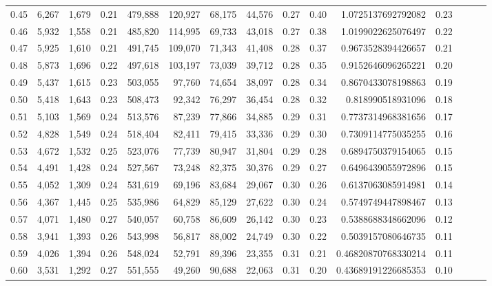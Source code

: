 \begin{tabular}{rrrrrrrrrrrrrrr}
0.45 &   6,267 &  1,679 &  0.21 &  479,888 &  120,927 &   68,175 &   44,576 &  0.27 &  0.40 &    1.0725137692792082 &      0.23 \\
0.46 &   5,932 &  1,558 &  0.21 &  485,820 &  114,995 &   69,733 &   43,018 &  0.27 &  0.38 &    1.0199022625076497 &      0.22 \\
0.47 &   5,925 &  1,610 &  0.21 &  491,745 &  109,070 &   71,343 &   41,408 &  0.28 &  0.37 &    0.9673528394426657 &      0.21 \\
0.48 &   5,873 &  1,696 &  0.22 &  497,618 &  103,197 &   73,039 &   39,712 &  0.28 &  0.35 &    0.9152646096265221 &      0.20 \\
0.49 &   5,437 &  1,615 &  0.23 &  503,055 &   97,760 &   74,654 &   38,097 &  0.28 &  0.34 &    0.8670433078198863 &      0.19 \\
0.50 &   5,418 &  1,643 &  0.23 &  508,473 &   92,342 &   76,297 &   36,454 &  0.28 &  0.32 &     0.818990518931096 &      0.18 \\
0.51 &   5,103 &  1,569 &  0.24 &  513,576 &   87,239 &   77,866 &   34,885 &  0.29 &  0.31 &    0.7737314968381656 &      0.17 \\
0.52 &   4,828 &  1,549 &  0.24 &  518,404 &   82,411 &   79,415 &   33,336 &  0.29 &  0.30 &    0.7309114775035255 &      0.16 \\
0.53 &   4,672 &  1,532 &  0.25 &  523,076 &   77,739 &   80,947 &   31,804 &  0.29 &  0.28 &    0.6894750379154065 &      0.15 \\
0.54 &   4,491 &  1,428 &  0.24 &  527,567 &   73,248 &   82,375 &   30,376 &  0.29 &  0.27 &    0.6496439055972896 &      0.15 \\
0.55 &   4,052 &  1,309 &  0.24 &  531,619 &   69,196 &   83,684 &   29,067 &  0.30 &  0.26 &    0.6137063085914981 &      0.14 \\
0.56 &   4,367 &  1,445 &  0.25 &  535,986 &   64,829 &   85,129 &   27,622 &  0.30 &  0.24 &    0.5749749447898467 &      0.13 \\
0.57 &   4,071 &  1,480 &  0.27 &  540,057 &   60,758 &   86,609 &   26,142 &  0.30 &  0.23 &    0.5388688348662096 &      0.12 \\
0.58 &   3,941 &  1,393 &  0.26 &  543,998 &   56,817 &   88,002 &   24,749 &  0.30 &  0.22 &    0.5039157080646735 &      0.11 \\
0.59 &   4,026 &  1,394 &  0.26 &  548,024 &   52,791 &   89,396 &   23,355 &  0.31 &  0.21 &   0.46820870768330214 &      0.11 \\
0.60 &   3,531 &  1,292 &  0.27 &  551,555 &   49,260 &   90,688 &   22,063 &  0.31 &  0.20 &   0.43689191226685353 &      0.10 \\

\end{tabular}
